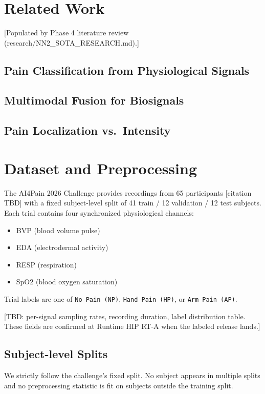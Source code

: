 \documentclass[conference]{IEEEtran}
\begin{document}
\section{Related Work}
[Populated by Phase 4 literature review (research/NN2\_SOTA\_RESEARCH.md).]
\subsection{Pain Classification from Physiological Signals}
\subsection{Multimodal Fusion for Biosignals}
\subsection{Pain Localization vs.\ Intensity}

\section{Dataset and Preprocessing}
The AI4Pain 2026 Challenge provides recordings from 65 participants
[citation TBD] with a fixed subject-level split of 41 train / 12 validation /
12 test subjects. Each trial contains four synchronized physiological
channels:
\begin{itemize}
  \item BVP (blood volume pulse)
  \item EDA (electrodermal activity)
  \item RESP (respiration)
  \item SpO2 (blood oxygen saturation)
\end{itemize}
Trial labels are one of \texttt{No Pain (NP)}, \texttt{Hand Pain (HP)}, or
\texttt{Arm Pain (AP)}.

[TBD: per-signal sampling rates, recording duration, label distribution table.
These fields are confirmed at Runtime HIP RT-A when the labeled release lands.]

\subsection{Subject-level Splits}
We strictly follow the challenge's fixed split. No subject appears in
multiple splits and no preprocessing statistic is fit on subjects outside the
training split.
\end{document}
